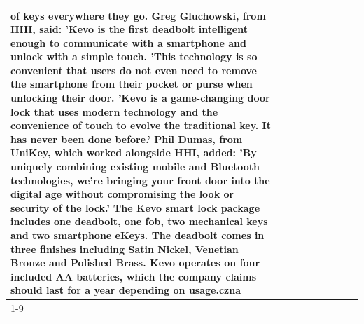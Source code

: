 \begin{table}[H]
\begin{tabular}{lllrlllll}
of keys everywhere they go. Greg Gluchowski, from HHI, said: 'Kevo is the first deadbolt intelligent enough to communicate with a smartphone and unlock with a simple touch. 'This technology is so convenient that users do not even need to remove the smartphone from their pocket or purse when unlocking their door. 'Kevo is a game-changing door lock that uses modern technology and the convenience of touch to evolve the traditional key. It has never been done before.' Phil Dumas, from UniKey, which worked alongside HHI, added: 'By uniquely combining existing mobile and Bluetooth technologies, we’re bringing your front door into the digital age without compromising the look or security of the lock.' The Kevo smart lock package includes one deadbolt, one fob, two mechanical keys and two smartphone eKeys. The deadbolt comes in three finishes including Satin Nickel, Venetian Bronze and Polished Brass. Kevo operates on four included AA batteries, which the company claims should last for a year depending on usage.czna \\
\cline{1-9}

\end{tabular}
\end{table}
